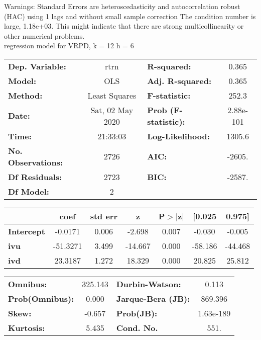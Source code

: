 Warnings: \newline
 [1] Standard Errors are heteroscedasticity and autocorrelation robust (HAC) using 1 lags and without small sample correction \newline
 [2] The condition number is large, 1.18e+03. This might indicate that there are \newline
 strong multicollinearity or other numerical problems.\\ 

regression model for VRPD, k = 12 h = 6\begin{center}
\begin{tabular}{lclc}
\toprule
\textbf{Dep. Variable:}    &       rtrn       & \textbf{  R-squared:         } &     0.365   \\
\textbf{Model:}            &       OLS        & \textbf{  Adj. R-squared:    } &     0.365   \\
\textbf{Method:}           &  Least Squares   & \textbf{  F-statistic:       } &     252.3   \\
\textbf{Date:}             & Sat, 02 May 2020 & \textbf{  Prob (F-statistic):} & 2.88e-101   \\
\textbf{Time:}             &     21:33:03     & \textbf{  Log-Likelihood:    } &    1305.6   \\
\textbf{No. Observations:} &        2726      & \textbf{  AIC:               } &    -2605.   \\
\textbf{Df Residuals:}     &        2723      & \textbf{  BIC:               } &    -2587.   \\
\textbf{Df Model:}         &           2      & \textbf{                     } &             \\
\bottomrule
\end{tabular}
\begin{tabular}{lcccccc}
                   & \textbf{coef} & \textbf{std err} & \textbf{z} & \textbf{P$> |$z$|$} & \textbf{[0.025} & \textbf{0.975]}  \\
\midrule
\textbf{Intercept} &      -0.0171  &        0.006     &    -2.698  &         0.007        &       -0.030    &       -0.005     \\
\textbf{ivu}       &     -51.3271  &        3.499     &   -14.667  &         0.000        &      -58.186    &      -44.468     \\
\textbf{ivd}       &      23.3187  &        1.272     &    18.329  &         0.000        &       20.825    &       25.812     \\
\bottomrule
\end{tabular}
\begin{tabular}{lclc}
\textbf{Omnibus:}       & 325.143 & \textbf{  Durbin-Watson:     } &     0.113  \\
\textbf{Prob(Omnibus):} &   0.000 & \textbf{  Jarque-Bera (JB):  } &   869.396  \\
\textbf{Skew:}          &  -0.657 & \textbf{  Prob(JB):          } & 1.63e-189  \\
\textbf{Kurtosis:}      &   5.435 & \textbf{  Cond. No.          } &      551.  \\
\bottomrule
\end{tabular}
\end{center}

